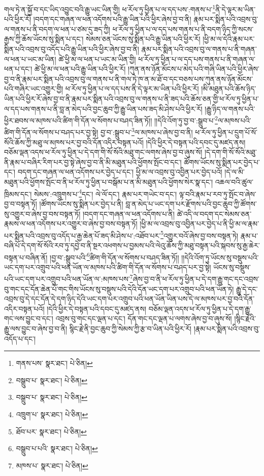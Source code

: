 གལ་ཏེ་ན་སྐྱོ་བ་དང་ཡིད་འབྱུང་བའི་རྒྱུ་ཡང་ཡིན་གྱི། ཕ་རོལ་ཏུ་ཕྱིན་པ་ལ་དད་པས་:གནས་པ་\footnote{གནས་པས་  སྣར་ཐང་།  པེ་ཅིན། }ནི་དེ་ལྟར་མ་ཡིན་པའི་ཕྱིར་རོ། །བདག་དང་གཞན་ལ་ཕན་འདོགས་པའི་རྒྱུ་ཡིན་པའི་ཕྱིར་ཞེས་བྱ་བ་ནི། རྣམ་པར་སྨིན་པའི་འབྲས་བུ་ལ་གནས་པ་ནི་བདག་ལ་ཕན་པ་ཙམ་དུ་ཟད་ཀྱི། ཕ་རོལ་ཏུ་ཕྱིན་པ་ལ་དད་པས་གནས་པ་ནི་བདག་ཉིད་ཀྱི་སངས་རྒྱས་ཀྱི་ཆོས་ཡོངས་སུ་སྨིན་པ་དང་། སེམས་ཅན་ཡོངས་སུ་སྨིན་པའི་རྒྱུ་ཡིན་པའི་ཕྱིར་རོ། །ཕྱི་མ་ལ་དེའི་རྣམ་པར་སྨིན་པའི་འབྲས་བུ་འདོད་པའི་རྒྱུ་ཡིན་པའི་ཕྱིར་ཞེས་བྱ་བ་ནི། རྣམ་པར་སྨིན་པའི་འབྲས་བུ་ལ་གནས་པ་ནི་གཞན་ལ་ཕན་པ་ཡང་མ་ཡིན། ཚེ་ཕྱི་མ་ལ་ཕན་པ་ཡང་མ་ཡིན་གྱི། ཕ་རོལ་ཏུ་ཕྱིན་པ་ལ་དད་པས་གནས་པ་ནི་གཞན་ལ་ཕན་པ་དང་། ཚེ་ཕྱི་མ་ལ་ཕན་པའི་རྒྱུ་ཡིན་པའི་ཕྱིར་རོ། །ཀུན་ནས་ཉོན་མོངས་པ་མེད་པའི་གཞི་ཡིན་པའི་ཕྱིར་ཞེས་བྱ་བ་ནི་རྣམ་པར་སྨིན་པའི་འབྲས་བུ་ལ་གནས་པ་ནི་གལ་ཏེ་ཁ་ན་མ་ཐོ་བ་དང་བཅས་པས་ཀུན་ནས་ཉོན་མོངས་པའི་གཞིར་ཡང་འགྱུར་གྱི། ཕ་རོལ་ཏུ་ཕྱིན་པ་ལ་དད་པས་ནི་དེ་ལྟར་མ་ཡིན་པའི་ཕྱིར་རོ། །མི་མཐུན་པའི་ཆོས་ཉིད་ཡིན་པའི་ཕྱིར་རོ་ཞེས་བྱ་བ་ནི་རྣམ་པར་སྨིན་པའི་འབྲས་བུ་ལ་གནས་པ་ནི་ཟད་པའི་ཆོས་ཅན་གྱི་ཕ་རོལ་ཏུ་ཕྱིན་པ་ལ་དད་པས་གནས་པ་ནི་བླ་ན་མེད་པའི་བྱང་ཆུབ་ཀྱི་རྒྱུ་ཡིན་པས་ཟད་མི་ཤེས་པའི་ཕྱིར་རོ། །རྒྱུ་ཉིད་ལ་གནས་པའི་ཕྱིར་ཐབས་ལ་མཁས་པའི་ཚིག་གི་དོན་ལ་སོགས་པ་བཤད་ཟིན་ཏོ།། །།དེའི་འོག་ཏུ་བྱ་བ་:སྒྲུབ་པ་\footnote{བསྒྲུབ་པ་  སྣར་ཐང་།  པེ་ཅིན། }ལ་མཁས་པའི་ཚིག་གི་དོན་ལ་སོགས་པ་བཤད་པར་བྱ་སྟེ། བྱ་བ་:སྒྲུབ་པ་\footnote{བསྒྲུབ་པ་  སྣར་ཐང་།  པེ་ཅིན། }ལ་མཁས་པ་ཞེས་བྱ་བ་ནི། ཕ་རོལ་ཏུ་ཕྱིན་པ་དྲུག་པོ་སོ་སོའི་ཆོས་ཀྱི་མཐུ་ལ་མཁས་པར་བྱ་བའི་དོན་འདིར་བསྟན་པའོ། །དེའི་ཕྱིར་དེ་བསྟན་པའི་དབང་དུ་མཛད་ནས། བཅོམ་ལྡན་འདས་ཕ་རོལ་ཏུ་ཕྱིན་པ་དེ་དག་གི་སོ་སོའི་མཐུ་གང་ལགས་ཞེས་བྱ་བ་ཞུས་སོ། །དེ་དག་གི་སོ་སོའི་མཐུ་ནི་རྣམ་པ་བཞིར་རིག་པར་བྱ་སྟེ་ཞེས་བྱ་བ་ནི་མི་མཐུན་པའི་ཕྱོགས་སྤོང་བ་དང་། ཚོགས་ཡོངས་སུ་སྨིན་པར་བྱེད་པ་དང་། བདག་དང་གཞན་ལ་ཕན་འདོགས་པར་བྱེད་པ་དང་། ཕྱི་མ་ལ་འབྲས་བུ་འབྱིན་པར་བྱེད་པའོ། །དེ་ལ་མི་མཐུན་པའི་ཕྱོགས་སྤོང་བ་ནི་ཕ་རོལ་ཏུ་ཕྱིན་པ་བསྒོམ་པ་ན་མི་མཐུན་པའི་ཕྱོགས་སེར་སྣ་དང་། འཆལ་བའི་ཚུལ་ཁྲིམས་དང་། སེམས་:འཁྲུགས་པ་\footnote{འཁྲུག་པ་  སྣར་ཐང་།  པེ་ཅིན། }དང་། ལེ་ལོ་དང་། རྣམ་པར་གཡེང་བ་དང་། ལྟ་བའི་རྣམ་པ་རབ་ཏུ་སྤོང་བ་ཞེས་བྱ་བ་བསྟན་ཏོ། །ཚོགས་ཡོངས་སུ་སྨིན་པར་བྱེད་པ་ནི། བླ་ན་མེད་པ་ཡང་དག་པར་རྫོགས་པའི་བྱང་ཆུབ་ཀྱི་ཚོགས་སུ་འགྱུར་བ་ཞེས་བྱ་བས་བསྟན་ཏོ། །བདག་དང་གཞན་ལ་ཕན་འདོགས་པ་ནི། ཚེ་འདི་ལ་བདག་དང་སེམས་ཅན་རྣམས་ལ་ཕན་འདོགས་པར་འགྱུར་བ་ཞེས་བྱ་བས་བསྟན་ཏོ། །ཕྱི་མ་ལ་འབྲས་བུ་འབྱིན་པར་བྱེད་པ་ནི་ཕྱི་མ་ལ་རྣམ་པར་སྨིན་པའི་འབྲས་བུ་འདོད་པ་རྒྱ་ཆེན་པོ་ཟད་མི་ཤེས་པ་:འཐོབ་པར་\footnote{ཐོབ་པར་  སྣར་ཐང་།  པེ་ཅིན། }འགྱུར་བའོ་ཞེས་བྱ་བས་བསྟན་ཏེ། རྣམ་པ་བཞི་པོ་དེ་དག་སོ་སོའི་རབ་ཏུ་དབྱེ་བ་ནི་སྔར་འཕགས་པ་བྱམས་པའི་ལེའུ་ཆོས་ཀྱི་མཐུ་བསྟན་པའི་སྐབས་སུ་རྒྱ་ཆེར་བསྟན་པ་བཞིན་ནོ། །བྱ་བ་:སྒྲུབ་པའི་\footnote{བསྒྲུབ་པ་པའི་  སྣར་ཐང་།  པེ་ཅིན། }ཚིག་གི་དོན་ལ་སོགས་པ་བཤད་ཟིན་ཏོ།། །།དེའི་འོག་ཏུ་ཡོངས་སུ་བསྡུས་པའི་ཡང་དག་པར་འགྲུབ་པའི་ཕན་ཡོན་ལ་མཁས་པའི་ཚིག་གི་དོན་ལ་སོགས་པ་བཤད་པར་བྱ་སྟེ། ཡོངས་སུ་བསྡུས་པའི་ཡང་དག་པར་འགྲུབ་པའི་ཕན་ཡོན་ལ་:མཁས་པས་\footnote{མཁས་པ་  སྣར་ཐང་།  པེ་ཅིན། }ཞེས་བྱ་བ་ནི་ཕ་རོལ་ཏུ་ཕྱིན་པ་དེ་དག་རྒྱུ་གང་དང་འབྲས་བུ་གང་དང་དོན་ཆེན་པོ་གང་གིས་ཡོངས་སུ་བསྡུས་པའི་དེའི་དོན་ཡང་དག་པར་འགྲུབ་པའི་ཕན་ཡོན་ཏེ། རྒྱུ་དེ་དང་འབྲས་བུ་དེ་དང་དོན་དེ་དག་ཉིད་དེའི་ཡང་དག་པར་འགྲུབ་པའི་ཕན་ཡོན་ཡིན་པས་དེ་ལ་མཁས་པར་བྱ་བའི་དོན་འདིར་བསྟན་པའོ། །དེའི་ཕྱིར་དེ་བསྟན་པའི་དབང་དུ་མཛད་ནས། བཅོམ་ལྡན་འདས་ཕ་རོལ་ཏུ་ཕྱིན་པ་དེ་དག་རྒྱུ་གང་ལས་བྱུང་བ་དང་། འབྲས་བུ་གང་དང་ལྡན་པ་དང་། དོན་གང་དང་ལྡན་པ་ལགས་ཞེས་བྱ་བ་ཞུས་སོ། །སྙིང་རྗེའི་རྒྱུ་ལས་བྱུང་བ་ཞེས་བྱ་བ་ནི། སྙིང་རྗེ་ནི་བྱང་ཆུབ་ཀྱི་སེམས་ཀྱི་རྩ་བ་ཡིན་པའི་ཕྱིར་རོ། །རྣམ་པར་སྨིན་པའི་འབྲས་བུ་འདོད་པ་དང་། 